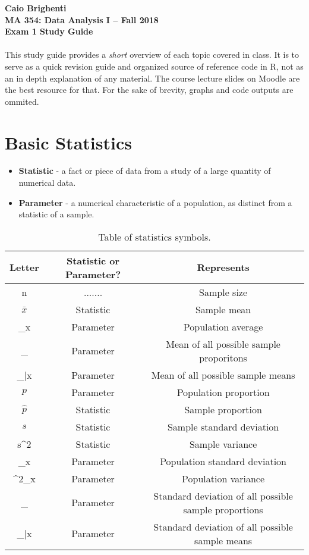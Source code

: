 \documentclass{article}
\begin{document}

\noindent \textbf{Caio Brighenti }\\
\noindent \textbf{MA 354: Data Analysis I -- Fall 2018}\\%
\noindent \textbf{Exam 1 Study Guide}\vspace{1em}\\
\\ This study guide provides a \emph{short} overview of each topic covered in class. It is to serve as a quick revision guide and organized source of reference code in R, not as an in depth explanation of any material. The course lecture slides on Moodle are the best resource for that. For the sake of brevity, graphs and code outputs are ommited.
\section{Basic Statistics}
  \begin{itemize}
    \item \textbf{Statistic} - a fact or piece of data from a study of a large quantity of numerical data.
    \item \textbf{Parameter} - a numerical characteristic of a population, as distinct from a statistic of a sample.
  \end{itemize}
  \begin{table}[H]
	  \begin{center}
		  \begin{tabular} {|c|c|c|} \hline
			    Letter & Statistic or Parameter? & Represents\\\hline\hline
			    n & ....... & Sample size \\\hline
			    $\bar{x}$ & Statistic & Sample mean \\\hline
			    \mu_x & Parameter & Population average \\\hline
			    \mu_\hat{p} & Parameter & Mean of all possible sample proporitons \\\hline
			    \mu_\bar{x} & Parameter & Mean of all possible sample means \\\hline
			    $p$ & Parameter & Population proportion \\\hline
			    $\hat{p}$ & Statistic & Sample proportion \\\hline
			    $s$ & Statistic & Sample standard deviation \\\hline
			    s^2 & Statistic & Sample variance \\\hline
			    \sigma_x & Parameter & Population standard deviation \\\hline
			    \sigma^{2}_{x} & Parameter & Population variance \\\hline
			    \sigma_{\hat{p}} & Parameter & Standard deviation of all possible sample proportions \\\hline
			    \sigma_{\bar{x}} & Parameter & Standard deviation of all possible sample means \\\hline
		  \end{tabular}
		  \caption{Table of statistics symbols.}\label{psim}
	  \end{center}
  \end{table}
\end{document}
